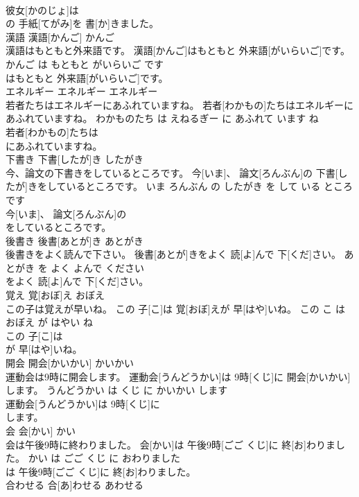 \documentclass[8pt]{extreport}
\begin{document}
\begin{CJK}{UTF8}{min}
\\	彼女[かのじょ]は
\\	の 手紙[てがみ]を 書[か]きました。			
\\	漢語	漢語[かんご]	かんご	
\\	漢語はもともと外来語です。	漢語[かんご]はもともと 外来語[がいらいご]です。	かんご は もともと がいらいご です	
\\	はもともと 外来語[がいらいご]です。			
\\	エネルギー	エネルギー	エネルギー	
\\	若者たちはエネルギーにあふれていますね。	若者[わかもの]たちはエネルギーにあふれていますね。	わかものたち は えねるぎー に あふれて います ね	
\\	若者[わかもの]たちは
\\	にあふれていますね。			
\\	下書き	下書[したが]き	したがき	
\\	今、論文の下書きをしているところです。	今[いま]、 論文[ろんぶん]の 下書[したが]きをしているところです。	いま ろんぶん の したがき を して いる ところ です	
\\	今[いま]、 論文[ろんぶん]の
\\	をしているところです。			
\\	後書き	後書[あとが]き	あとがき	
\\	後書きをよく読んで下さい。	後書[あとが]きをよく 読[よ]んで 下[くだ]さい。	あとがき を よく よんで ください	
\\	をよく 読[よ]んで 下[くだ]さい。			
\\	覚え	覚[おぼ]え	おぼえ	
\\	この子は覚えが早いね。	この 子[こ]は 覚[おぼ]えが 早[はや]いね。	この こ は おぼえ が はやい ね	
\\	この 子[こ]は
\\	が 早[はや]いね。			
\\	開会	開会[かいかい]	かいかい	
\\	運動会は9時に開会します。	運動会[うんどうかい]は 9時[くじ]に 開会[かいかい]します。	うんどうかい は くじ に かいかい します	
\\	運動会[うんどうかい]は 9時[くじ]に
\\	します。			
\\	会	会[かい]	かい	
\\	会は午後9時に終わりました。	会[かい]は 午後9時[ごご くじ]に 終[お]わりました。	かい は ごご くじ に おわりました	
\\	は 午後9時[ごご くじ]に 終[お]わりました。			
\\	合わせる	合[あ]わせる	あわせる	

\end{CJK}
\end{document}

